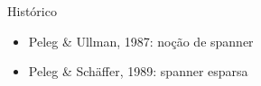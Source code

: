 \documentclass[dvipsnames]{beamer}
\begin{document}
\begin{frame}{Histórico
  }
  \hypertarget{hist}{}
  \begin{itemize}
    \item Peleg \& Ullman, 1987: noção de spanner
    \item <2->Peleg \& Sch\"{a}ffer, 1989: spanner esparsa
  \end{itemize}
\end{frame}


\end{document}
